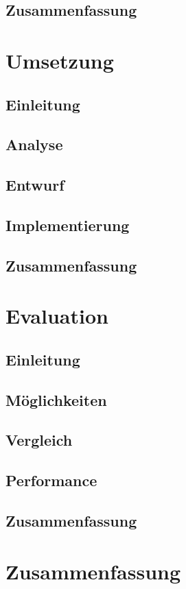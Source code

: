 \section{Zusammenfassung}

\chapter{Umsetzung}
\section{Einleitung}
\section{Analyse}
\section{Entwurf}
\section{Implementierung}
\section{Zusammenfassung}

\chapter{Evaluation}
\section{Einleitung}
\section{Möglichkeiten}
\section{Vergleich}
\section{Performance}
\section{Zusammenfassung}

\chapter{Zusammenfassung}



